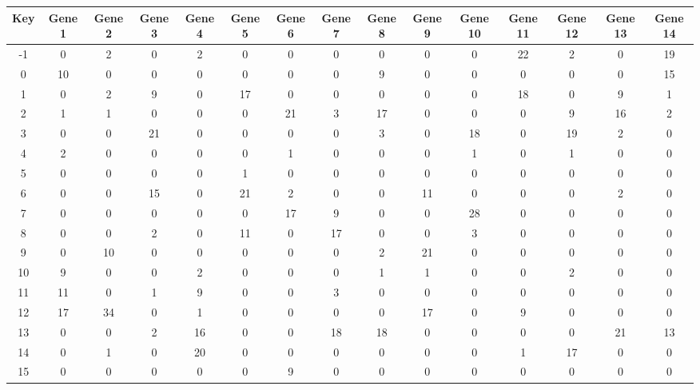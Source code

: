 \begin{tabular}{|c|c|c|c|c|c|c|c|c|c|c|c|c|c|c|}
\hline
Key & Gene 1 & Gene 2 & Gene 3 & Gene 4 & Gene 5 & Gene 6 & Gene 7 & Gene 8 & Gene 9 & Gene 10 & Gene 11 & Gene 12 & Gene 13 & Gene 14 \\
\hline
-1 & 0 & 2 & 0 & 2 & 0 & 0 & 0 & 0 & 0 & 0 & 22 & 2 & 0 & 19 \\
0 & 10 & 0 & 0 & 0 & 0 & 0 & 0 & 9 & 0 & 0 & 0 & 0 & 0 & 15 \\
1 & 0 & 2 & 9 & 0 & 17 & 0 & 0 & 0 & 0 & 0 & 18 & 0 & 9 & 1 \\
2 & 1 & 1 & 0 & 0 & 0 & 21 & 3 & 17 & 0 & 0 & 0 & 9 & 16 & 2 \\
3 & 0 & 0 & 21 & 0 & 0 & 0 & 0 & 3 & 0 & 18 & 0 & 19 & 2 & 0 \\
4 & 2 & 0 & 0 & 0 & 0 & 1 & 0 & 0 & 0 & 1 & 0 & 1 & 0 & 0 \\
5 & 0 & 0 & 0 & 0 & 1 & 0 & 0 & 0 & 0 & 0 & 0 & 0 & 0 & 0 \\
6 & 0 & 0 & 15 & 0 & 21 & 2 & 0 & 0 & 11 & 0 & 0 & 0 & 2 & 0 \\
7 & 0 & 0 & 0 & 0 & 0 & 17 & 9 & 0 & 0 & 28 & 0 & 0 & 0 & 0 \\
8 & 0 & 0 & 2 & 0 & 11 & 0 & 17 & 0 & 0 & 3 & 0 & 0 & 0 & 0 \\
9 & 0 & 10 & 0 & 0 & 0 & 0 & 0 & 2 & 21 & 0 & 0 & 0 & 0 & 0 \\
10 & 9 & 0 & 0 & 2 & 0 & 0 & 0 & 1 & 1 & 0 & 0 & 2 & 0 & 0 \\
11 & 11 & 0 & 1 & 9 & 0 & 0 & 3 & 0 & 0 & 0 & 0 & 0 & 0 & 0 \\
12 & 17 & 34 & 0 & 1 & 0 & 0 & 0 & 0 & 17 & 0 & 9 & 0 & 0 & 0 \\
13 & 0 & 0 & 2 & 16 & 0 & 0 & 18 & 18 & 0 & 0 & 0 & 0 & 21 & 13 \\
14 & 0 & 1 & 0 & 20 & 0 & 0 & 0 & 0 & 0 & 0 & 1 & 17 & 0 & 0 \\
15 & 0 & 0 & 0 & 0 & 0 & 9 & 0 & 0 & 0 & 0 & 0 & 0 & 0 & 0 \\
\hline
\end{tabular}